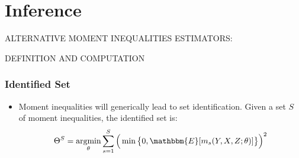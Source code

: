 \documentclass[10pt,letterpaper]{beamer}
\begin{document}
\section{Inference}


\begin{frame}
\centerline{ALTERNATIVE MOMENT INEQUALITIES ESTIMATORS:} %
\centerline{DEFINITION AND COMPUTATION}
\end{frame}


\begin{frame}
\frametitle{Identified Set}

\begin{itemize}
\item Moment inequalities will generically lead to set identification. Given
a set $S$ of moment inequalities, the identified set is:  
\begin{equation*}
\Theta^{S}=\operatornamewithlimits{argmin}_{\theta}\sum_{s=1}^{S}\Big(\min%
\big\{0,\mathbbm{E}[m_{s}(Y,X,Z;\theta)]\big\}\Big)^{2}
\end{equation*}
\begin{figure}[h!]
\begin{center}
   
\end{center}
\end{figure}
\end{itemize}
\end{frame}
\end{document}
